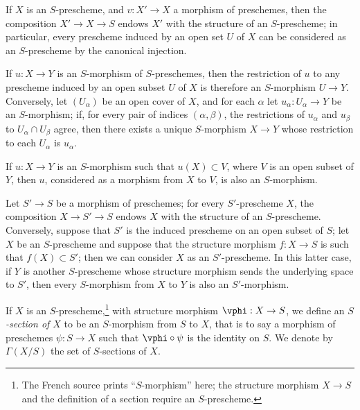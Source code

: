 \begin{env}[2.5.3]
\label{I.2.5.3}
If $X$ is an $S$-prescheme, and $v:X'\to X$ a morphism of preschemes, then the composition $X'\to X\to S$ endows $X'$ with the structure of an $S$-prescheme;
in particular, every prescheme induced by an open set $U$ of $X$ can be considered as an $S$-prescheme by the canonical injection.

If $u:X\to Y$ is an $S$-morphism of $S$-preschemes, then the restriction of $u$ to any prescheme induced by an open subset $U$ of $X$ is therefore an $S$-morphism $U\to Y$.
Conversely, let $(U_\alpha)$ be an open cover of $X$, and for each $\alpha$ let $u_\alpha:U_\alpha\to Y$ be an $S$-morphism;
if, for every pair of indices $(\alpha,\beta)$, the restrictions of $u_\alpha$ and $u_\beta$ to $U_\alpha\cap U_\beta$ agree, then there exists a unique $S$-morphism $X\to Y$ whose restriction to each $U_\alpha$ is $u_\alpha$.

If $u:X\to Y$ is an $S$-morphism such that $u(X)\subset V$, where $V$ is an open subset of $Y$, then $u$, considered as a morphism from $X$ to $V$, is also an $S$-morphism.
\end{env}

\begin{env}[2.5.4]
\label{I.2.5.4}
Let $S'\to S$ be a morphism of preschemes;
for every $S'$-prescheme $X$, the composition $X\to S'\to S$ endows $X$ with the structure of an $S$-prescheme.
Conversely, suppose that $S'$ is the induced prescheme on an open subset of $S$;
let $X$ be an $S$-prescheme and suppose that the structure morphism $f:X\to S$ is such that $f(X)\subset S'$;
then we can consider $X$ as an $S'$-prescheme.
In this latter case, if $Y$ is another $S$-prescheme whose structure morphism sends the underlying space to $S'$, then every $S$-morphism from $X$ to $Y$ is also an $S'$-morphism.
\end{env}

\begin{env}[2.5.5]
\label{I.2.5.5}
If $X$ is an $S$-prescheme,\footnote{The French source prints ``$S$-morphism'' here; the structure morphism $X\to S$ and the definition of a section require an $S$-prescheme.} with structure morphism $\vphi:X\to S$, we define an \emph{$S$-section of $X$} to be an $S$-morphism from $S$ to $X$, that is to say a morphism of preschemes $\psi:S\to X$ such that $\vphi\circ\psi$ is the identity on $S$.
We denote by $\Gamma(X/S)$ the set of $S$-sections of $X$.
\end{env}
